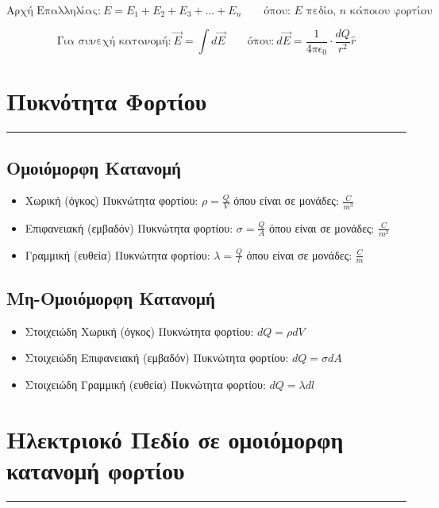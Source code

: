 \documentclass[a4paper,12pt]{article}
\begin{document}
\begin{equation*}
    \text{Αρχή Επαλληλίας:} \ E = E_1 + E_2 + E_3 + \dots + E_n \qquad \text{όπου: $E$ πεδίο, $n$ κάποιου φορτίου} 
\end{equation*}

\vspace{-0.3cm}

\begin{equation*}
    \text{Για συνεχή κατανομή:} \ \vec{E} = \int d\vec{E} \qquad \text{όπου:} \ d\vec{E} = \frac{1}{4\pi\epsilon_0}\cdot\frac{dQ}{r^2}\hat{r} 
\end{equation*}

\section*{Πυκνότητα Φορτίου}
\vspace{-.4cm}
\hrule
\vspace{0.3cm}

\subsection*{Ομοιόμορφη Κατανομή}

\begin{itemize}
    \item Χωρική (όγκος) Πυκνώτητα φορτίου: $\rho = \frac{Q}{V}$ όπου είναι σε μονάδες: $\frac{C}{m^3}$
    \item Επιφανειακή (εμβαδόν) Πυκνώτητα φορτίου: $\sigma = \frac{Q}{A}$ όπου είναι σε μονάδες: $\frac{C}{m^2}$
    \item Γραμμική (ευθεία) Πυκνώτητα φορτίου: $\lambda = \frac{Q}{l}$ όπου είναι σε μονάδες: $\frac{C}{m}$
\end{itemize}

\subsection*{Μη-Ομοιόμορφη Κατανομή}
\begin{itemize}
    \item Στοιχειώδη Χωρική (όγκος) Πυκνώτητα φορτίου: $dQ = \rho dV$
    \item Στοιχειώδη Επιφανειακή (εμβαδόν) Πυκνώτητα φορτίου: $dQ = \sigma dA$
    \item Στοιχειώδη Γραμμική (ευθεία) Πυκνώτητα φορτίου: $dQ = \lambda dl$
\end{itemize}

\section*{Ηλεκτριοκό Πεδίο σε ομοιόμορφη κατανομή φορτίου}
\vspace{-.4cm}
\hrule
\vspace{0.3cm}
\end{document}
